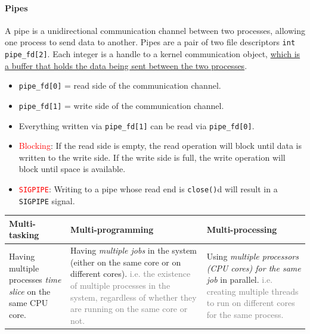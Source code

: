 \documentclass[openany,12pt]{book}
\newcommand{\code}[1]{\texttt{#1}}
\newcommand{\red}[1]{\textcolor{Red}{#1}}
\newcommand{\gray}[1]{\textcolor{gray}{#1}}
\begin{document}
\paragraph{Pipes} A pipe is a unidirectional communication channel between two processes, allowing one process to send data to another. Pipes are a pair of two file descriptors \code{int pipe\_fd[2]}. Each integer is a handle to a kernel communication object, \ul{which is a buffer that holds the data being sent between the two processes}.
\begin{itemize}
  \item \code{pipe\_fd[0]} = read side of the communication channel.
  \item \code{pipe\_fd[1]} = write side of the communication channel.
  \item Everything written via \code{pipe\_fd[1]} can be read via \code{pipe\_fd[0]}.
  \item \red{Blocking}: If the read side is empty, the read operation will block until data is written to the write side. If the write side is full, the write operation will block until space is available.
  \item \red{\code{SIGPIPE}}: Writing to a pipe whose read end is \code{close()}d will result in a \code{SIGPIPE} signal.
\end{itemize}



\begin{samepage}
  \begin{center}
    \begin{tabular}{|>{\raggedright\arraybackslash}p{4cm}|
      >{\raggedright\arraybackslash}p{6cm}|
      >{\raggedright\arraybackslash}p{5cm}|}
      \hline
      \rowcolor{blue!30}
      \textbf{Multi-tasking} & \textbf{Multi-programming} & \textbf{Multi-processing} \\
      \hline
      Having multiple processes \textit{time slice} on the same CPU core.
                             &
      Having \textit{multiple jobs} in the system (either on the same core or on different cores). \gray{i.e. the existence of multiple processes in the system, regardless of whether they are running on the same core or not.}
                             &
      Using \textit{multiple processors (CPU cores) for the same job} in parallel. \gray{i.e. creating multiple threads to run on different cores for the same process.}
      \\
      \hline
    \end{tabular}
  \end{center}
\end{samepage}
\end{document}
